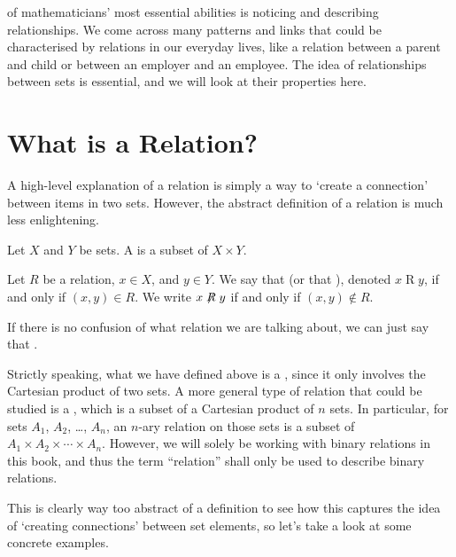  of mathematicians' most essential abilities is noticing and describing relationships. We come across many patterns and links that could be characterised by relations in our everyday lives, like a relation between a parent and child or between an employer and an employee. The idea of relationships between sets is essential, and we will look at their properties here.

\section{What is a Relation?}
A high-level explanation of a relation is simply a way to `create a connection' between items in two sets. However, the abstract definition of a relation is much less enlightening.

\begin{definition}[Relation]
    Let $X$ and $Y$ be sets. A  is a subset of $X \times Y$.

    Let $R$ be a relation, $x \in X$, and $y \in Y$. We say that  (or that ), denoted $x\mathrel{R}y$, if and only if $(x, y) \in R$. We write $x\not\mathrel{R}y$ if and only if $(x, y) \notin R$.

    If there is no confusion of what relation we are talking about, we can just say that .
\end{definition}
\begin{remark}
    Strictly speaking, what we have defined above is a , since it only involves the Cartesian product of two sets. A more general type of relation that could be studied is a , which is a subset of a Cartesian product of $n$ sets. In particular, for sets $A_1$, $A_2$, \dots, $A_n$, an $n$-ary relation on those sets is a subset of $A_1 \times A_2 \times \cdots \times A_n$. However, we will solely be working with binary relations in this book, and thus the term ``relation'' shall only be used to describe binary relations.
\end{remark}

This is clearly way too abstract of a definition to see how this captures the idea of `creating connections' between set elements, so let's take a look at some concrete examples.

